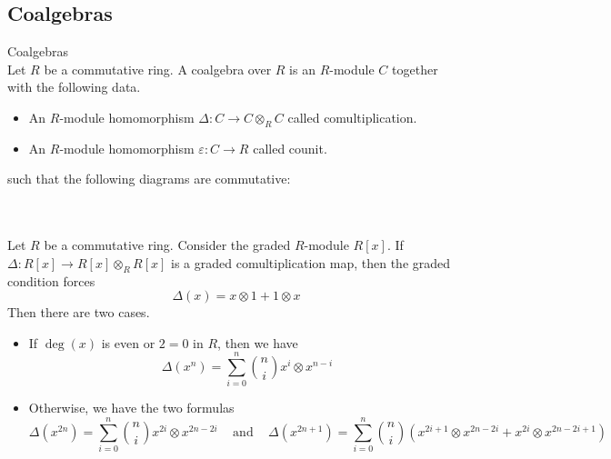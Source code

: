 \documentclass[a4paper]{article}
\begin{document}
\subsection{Coalgebras}
\begin{defn}{Coalgebras}{}\\
Let $R$ be a commutative ring. A coalgebra over $R$ is an $R$-module $C$ together with the following data. 
\begin{itemize}
\item An $R$-module homomorphism $\Delta:C\to C\otimes_RC$ called comultiplication. 
\item An $R$-module homomorphism $\varepsilon:C\to R$ called counit. 
\end{itemize}
such that the following diagrams are commutative: \\
 \\
\end{defn}

\begin{eg}{}{}\\
Let $R$ be a commutative ring. Consider the graded $R$-module $R[x]$. If $\Delta:R[x]\to R[x]\otimes_RR[x]$ is a graded comultiplication map, then the graded condition forces $$\Delta(x)=x\otimes 1+1\otimes x$$ Then there are two cases. 
\begin{itemize}
\item If $\deg(x)$ is even or $2=0$ in $R$, then we have $$\Delta(x^n)=\sum_{i=0}^n\binom{n}{i}x^i\otimes x^{n-i}$$
\item Otherwise, we have the two formulas $$\Delta(x^{2n})=\sum_{i=0}^n\binom{n}{i}x^{2i}\otimes x^{2n-2i}\;\;\;\text{ and }\;\;\;\Delta(x^{2n+1})=\sum_{i=0}^n\binom{n}{i}\left(x^{2i+1}\otimes x^{2n-2i}+x^{2i}\otimes x^{2n-2i+1}\right)$$
\end{itemize}
\end{eg}
\end{document}

